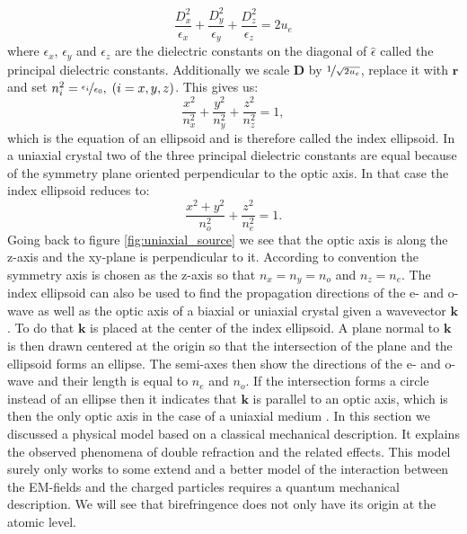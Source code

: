 \begin{equation}
    \frac{D_x^2}{\epsilon_x}+\frac{D_y^2}{\epsilon_y}+\frac{D_z^2}{\epsilon_z}= 2u_e
\end{equation}
where $\epsilon_x$, $\epsilon_y$ and $\epsilon_z$ are the dielectric constants on the diagonal of $\hat{\epsilon}$ called the principal dielectric constants. Additionally we scale $\bm{D}$ by $\nicefrac{1}{\sqrt{2u_e}}$, replace it with $\bm{r}$ and set $n_i^2 = \nicefrac{\epsilon_i}{\epsilon_0},\; (i=x,y,z)$. This gives us:
\begin{equation}
    \frac{x^2}{n_x^2}+\frac{y^2}{n_y^2}+\frac{z^2}{n_z^2}=1,
\end{equation}
which is the equation of an ellipsoid and is therefore called the index ellipsoid. In a uniaxial crystal two of the three principal dielectric constants are equal because of the symmetry plane oriented perpendicular to the optic axis. In that case the index ellipsoid reduces to:
\begin{equation}
    \label{eq:negative_index_ellipsod}
    \frac{x^2+y^2}{n_o^2}+\frac{z^2}{n_e^2}=1.
\end{equation}
Going back to figure \ref{fig:uniaxial_source} we see that the optic axis is along the z-axis and the xy-plane is perpendicular to it. According to convention the symmetry axis is chosen as the z-axis so that $n_x=n_y=n_o$ and $n_z=n_e$. The index ellipsoid can also be used to find the propagation directions of the e- and o-wave as well as the optic axis of a biaxial or uniaxial crystal given a wavevector $\bm{k}$. To do that $\bm{k}$ is placed at the center of the index ellipsoid. A plane normal to $\bm{k}$ is then drawn centered at the origin so that the intersection of the plane and the ellipsoid forms an ellipse. The semi-axes then show the directions of the e- and o-wave and their length is equal to $n_e$ and $n_o$. If the intersection forms a circle instead of an ellipse then it indicates that $\bm{k}$ is parallel to an optic axis, which is then the only optic axis in the case of a uniaxial medium \cite{Yariv1984, Griffiths2017}. 
In this section we discussed a physical model based on a classical mechanical description. It explains the observed phenomena of double refraction and the related effects. This model surely only works to some extend and a better model of the interaction between the EM-fields and the charged particles requires a quantum mechanical description. We will see that birefringence does not only have its origin at the atomic level. 

